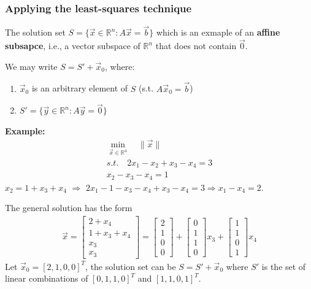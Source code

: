 \documentclass[11pt,a4paper]{article}
\begin{document}
\subsubsection{Applying the least-squares technique}
The solution set $S=\{\vec{x}\in \mathbb{R}^n: A \vec{x}=\vec{b}\}$ which is an exmaple  of an \textbf{affine subsapce}, i.e., a vector subspace of $\mathbb{R}^n$ that does not contain $\vec{0}$.

We may write $S=S'+\vec{x}_0$, where:
\begin{enumerate}[$\bullet$]
    \item $\vec{x}_0$ is an arbitrary element of $S$ (s.t. $A \vec{x}_0=\vec{b}$)
    \item $S'=\{\vec{y}\in \mathbb{R}^n: A \vec{y}=\vec{0}\}$
\end{enumerate}
\begin{center}
\end{center}

\textbf{Example:}
\begin{equation}
    \begin{aligned}
        \min_{\vec{x}\in \mathbb{R}^4}\quad \|\vec{x}\|\\
        s.t.\quad2x_1-x_2+x_3-x_4=3\\
        x_2-x_3-x_4=1
    \end{aligned}
    \nonumber
\end{equation}
$x_2=1+x_3+x_4$ $\Rightarrow$ $2x_1-1-x_3-x_4+x_3-x_4=3 \Rightarrow x_1-x_4=2$.

The general solution has the form
\begin{equation}
    \begin{aligned}
        \vec{x}=\begin{bmatrix}
            2+x_4\\1+x_3+x_4\\x_3\\x_3
        \end{bmatrix}=\begin{bmatrix}
            2\\1\\0\\0
        \end{bmatrix}+\begin{bmatrix}
            0\\1\\1\\0
        \end{bmatrix}x_3+\begin{bmatrix}
            1\\1\\0\\1
        \end{bmatrix}x_4
    \end{aligned}
    \nonumber
\end{equation}
Let $\vec{x}_0=[2,1,0,0]^T$, the solution set can be $S=S'+\vec{x}_0$ where $S'$ is the set of linear combinations of $[0,1,1,0]^T$ and $[1,1,0,1]^T$.
\end{document}
